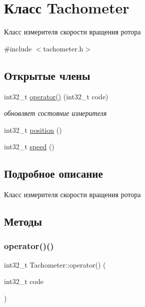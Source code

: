 \hypertarget{classTachometer}{}\section{Класс Tachometer}
\label{classTachometer}


Класс измерителя скорости вращения ротора  




{\ttfamily \#include $<$tachometer.\+h$>$}

\subsection*{Открытые члены}
\begin{DoxyCompactItemize}
\item 
int32\+\_\+t \hyperlink{classTachometer_a345db3ccae0763d72eab1b5fa7222790}{operator()} (int32\+\_\+t code)
\begin{DoxyCompactList}\small\item\em обновляет состояние измерителя \end{DoxyCompactList}\item 
int32\+\_\+t \hyperlink{classTachometer_a8d5931092b8a8029d93c6464d80a57bc}{position} ()
\item 
int32\+\_\+t \hyperlink{classTachometer_a0610c20594dac7015423e0d2862bba12}{speed} ()
\end{DoxyCompactItemize}


\subsection{Подробное описание}
Класс измерителя скорости вращения ротора 

\subsection{Методы}
\mbox{\label{classTachometer_a345db3ccae0763d72eab1b5fa7222790}} 
\subsubsection{\texorpdfstring{operator()()}{operator()()}}
{\footnotesize\ttfamily int32\+\_\+t Tachometer\+::operator() (\begin{DoxyParamCaption}\item[{int32\+\_\+t}]{code }\end{DoxyParamCaption})\hspace{0.3cm}{\ttfamily [inline]}}



